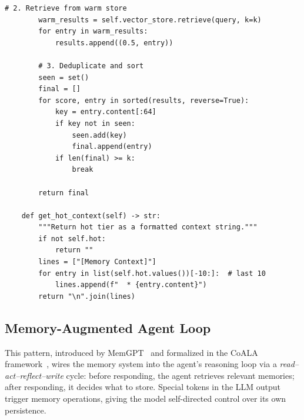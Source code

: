 \begin{lstlisting}[style=pythonstyle, caption={Hierarchical memory manager implementing hot/warm/cold tiers with automatic promotion and demotion.}]
        # 2. Retrieve from warm store
        warm_results = self.vector_store.retrieve(query, k=k)
        for entry in warm_results:
            results.append((0.5, entry))

        # 3. Deduplicate and sort
        seen = set()
        final = []
        for score, entry in sorted(results, reverse=True):
            key = entry.content[:64]
            if key not in seen:
                seen.add(key)
                final.append(entry)
            if len(final) >= k:
                break

        return final

    def get_hot_context(self) -> str:
        """Return hot tier as a formatted context string."""
        if not self.hot:
            return ""
        lines = ["[Memory Context]"]
        for entry in list(self.hot.values())[-10:]:  # last 10
            lines.append(f"  * {entry.content}")
        return "\n".join(lines)
\end{lstlisting}

\subsection{Memory-Augmented Agent Loop}
\label{memory-augmented-agent-loop}

This pattern, introduced by MemGPT~\cite{packer2023memgpt} and formalized in the CoALA framework~\cite{sumers2023coala}, wires the memory system into the agent’s reasoning loop via a \emph{read--act--reflect--write} cycle: before responding, the agent retrieves relevant memories; after responding, it decides what to store. Special tokens in the LLM output trigger memory operations, giving the model self-directed control over its own persistence.


